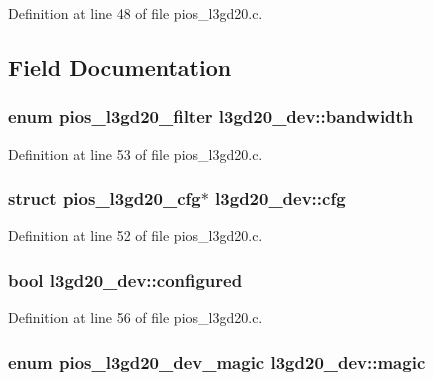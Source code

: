 Definition at line 48 of file pios\-\_\-l3gd20.\-c.



\subsection{Field Documentation}
\hypertarget{structl3gd20__dev_a0083cd18fa543ff4b6cf593ffd4ddf19}{
\subsubsection[{bandwidth}]{\setlength{\rightskip}{0pt plus 5cm}enum {\bf pios\-\_\-l3gd20\-\_\-filter} l3gd20\-\_\-dev\-::bandwidth}}\label{structl3gd20__dev_a0083cd18fa543ff4b6cf593ffd4ddf19}


Definition at line 53 of file pios\-\_\-l3gd20.\-c.

\hypertarget{structl3gd20__dev_af09c2ac64d5d4b325ba45fa55554eecb}{
\subsubsection[{cfg}]{\setlength{\rightskip}{0pt plus 5cm}struct {\bf pios\-\_\-l3gd20\-\_\-cfg}$\ast$ l3gd20\-\_\-dev\-::cfg}}\label{structl3gd20__dev_af09c2ac64d5d4b325ba45fa55554eecb}


Definition at line 52 of file pios\-\_\-l3gd20.\-c.

\hypertarget{structl3gd20__dev_a1a9fd22015b26a283f294efe6824ff51}{
\subsubsection[{configured}]{ {\bf bool} l3gd20\-\_\-dev\-::configured}}\label{structl3gd20__dev_a1a9fd22015b26a283f294efe6824ff51}


Definition at line 56 of file pios\-\_\-l3gd20.\-c.

\hypertarget{structl3gd20__dev_abfaba1dcc53adeb1fe6ba7fdb174d78a}{
\subsubsection[{magic}]{\setlength{\rightskip}{0pt plus 5cm}enum {\bf pios\-\_\-l3gd20\-\_\-dev\-\_\-magic} l3gd20\-\_\-dev\-::magic}}\label{structl3gd20__dev_abfaba1dcc53adeb1fe6ba7fdb174d78a}


